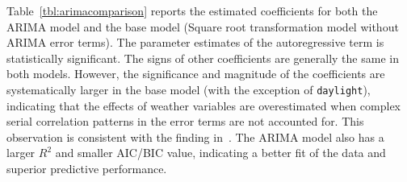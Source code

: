 \documentclass [11pt, proquest] {uwthesis}[2015/03/03]
\begin{document}
Table~\ref{tbl:arimacomparison} reports the estimated coefficients for both the ARIMA model and the base model (Square root transformation model without ARIMA error terms). The parameter estimates of the autoregressive term is statistically significant. The signs of other coefficients are generally the same in both models. However, the significance and magnitude of the coefficients are systematically larger in the base model (with the exception of \texttt{daylight}), indicating that the effects of weather variables are overestimated when complex serial correlation patterns in the error terms are not accounted for. This observation is consistent with the finding in~\cite{Gallop:2012aa}. The ARIMA model also has a larger $R^2$ and smaller AIC/BIC value, indicating a better fit of the data and superior predictive performance. 
\end{document}
